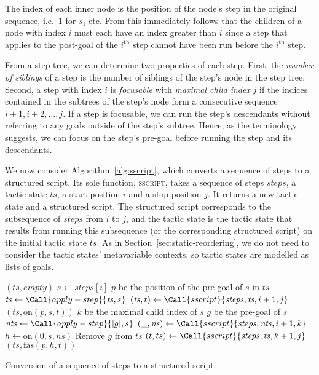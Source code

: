 \documentclass[sigplan,10pt,anonymous,review]{acmart}
\begin{document}
The index of each inner node is the position of the node's step in the original sequence, i.e.\ 1 for $s₁$ etc.
From this immediately follows that the children of a node with index $i$ must each have an index greater than $i$ since a step that applies to the post-goal of the $i^{\text{th}}$ step cannot have been run before the $i^{\text{th}}$ step.

From a step tree, we can determine two properties of each step.
First, the \emph{number of siblings} of a step is the number of siblings of the step's node in the step tree.
Second, a step with index $i$ is \emph{focusable} with \emph{maximal child index} $j$ if the indices contained in the subtrees of the step's node form a consecutive sequence $i+1, i+2, \dots, j$.
If a step is focusable, we can run the step's descendants without referring to any goals outside of the step's subtree.
Hence, as the terminology suggests, we can focus on the step's pre-goal before running the step and its descendants.

We now consider Algorithm~\ref{alg:sscript}, which converts a sequence of steps to a structured script.
Its sole function, \textsc{sscript}, takes a sequence of steps $\mathit{steps}$, a tactic state $\mathit{ts}$, a start position $i$ and a stop position $j$.
It returns a new tactic state and a structured script.
The structured script corresponds to the subsequence of $\mathit{steps}$ from $i$ to $j$, and the tactic state is the tactic state that results from running this subsequence (or the corresponding structured script) on the initial tactic state $\mathit{ts}$.
As in Section~\ref{sec:static-reordering}, we do not need to consider the tactic states' metavariable contexts, so tactic states are modelled as lists of goals.

\begin{algorithm}
  \begin{algorithmic}
        \State \Return $(\mathit{ts}, \mathit{empty})$
      \EndIf
      \State $s \gets \mathit{steps}[i]$
      \State \Let $p$ be the position of the pre-goal of $s$ in $\mathit{ts}$
        \State $\mathit{ts} \gets \Call{apply-step}{\mathit{ts}, s}$
        \State $(\mathit{ts}, t) \gets \Call{sscript}{\mathit{steps}, \mathit{ts}, i+1, j}$
        \State \Return $(\mathit{ts}, \mathrm{on}(p, s, t))$
      \Else
        \State \Let $k$ be the maximal child index of $s$
        \State \Let $g$ be the pre-goal of $s$
        \State $\mathit{nts} \gets \Call{apply-step}{[g], s}$
        \State $(\_, \mathit{ns}) \gets \Call{sscript}{\mathit{steps}, \mathit{nts}, i+1, k}$
        \State $h \gets \mathrm{on}(0, s, \mathit{ns})$
        \State Remove $g$ from $ts$
        \State $(t, ts) \gets \Call{sscript}{\mathit{steps}, \mathit{ts}, k+1, j}$
        \State \Return $(\mathit{ts}, \mathrm{fas}(p, h, t))$
      \EndIf
    \EndFunction
  \end{algorithmic}
  \caption{Conversion of a sequence of steps to a structured script}%
  \label{alg:sscript}
\end{algorithm}
\end{document}
